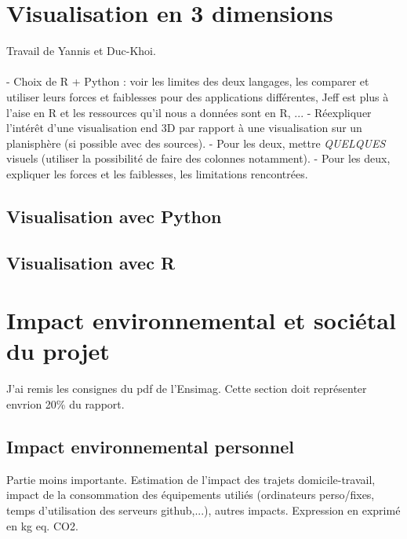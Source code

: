 \documentclass[12pt]{article}
\begin{document}
\section{Visualisation en 3 dimensions}
Travail de Yannis et Duc-Khoi.\\
\\
- Choix de R + Python : voir les limites des deux langages, les comparer et utiliser leurs forces et faiblesses pour des applications différentes, Jeff est plus à l'aise en R et les ressources qu'il nous a données sont en R, ...
- Réexpliquer l'intérêt d'une visualisation end 3D par rapport à une visualisation sur un planisphère (si possible avec des sources).
- Pour les deux, mettre \textit{QUELQUES} visuels (utiliser la possibilité de faire des colonnes notamment).
- Pour les deux, expliquer les forces et les faiblesses, les limitations rencontrées.

\subsection{Visualisation avec Python}
\subsection{Visualisation avec R}

\section{Impact environnemental et sociétal du projet}
J'ai remis les consignes du pdf de l'Ensimag. Cette section doit représenter envrion 20\% du rapport.
\subsection{Impact environnemental personnel}
Partie moins importante.
Estimation de l'impact des trajets domicile-travail, impact de la consommation des équipements utiliés (ordinateurs perso/fixes, temps d'utilisation des serveurs github,...), autres impacts.
Expression en exprimé en kg eq. CO2.
\end{document}
